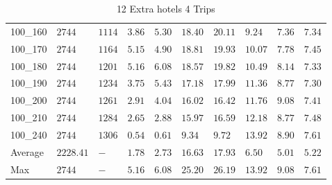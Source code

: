 \begin{center}
\begin{table}[]
\begin{tabular}{|lll|l|l|ll|lll|}
100\_160 & $2744   $   & $1114$ & $3.86$ & $5.30$   & $18.40$    & $20.11$   & $9.24 $& $7.36$   & $7.34 $ \\
100\_170 & $2744   $   & $1164$ & $5.15$ & $4.90$   & $18.81$    & $19.93$   & $10.07$& $7.78$   & $7.45 $ \\
100\_180 & $2744   $   & $1201$ & $5.16$ & $6.08$   & $18.57$    & $19.82$   & $10.49$& $8.14$   & $7.33 $ \\
100\_190 & $2744   $   & $1234$ & $3.75$ & $5.43$   & $17.18$    & $17.99$   & $11.36$& $8.77$   & $7.30 $ \\
100\_200 & $2744   $   & $1261$ & $2.91$ & $4.04$   & $16.02$    & $16.42$   & $11.76$& $9.08$   & $7.41 $ \\
100\_210 & $2744   $   & $1284$ & $2.65$ & $2.88$   & $15.97$    & $16.59$   & $12.18$& $8.77$   & $7.48 $ \\
100\_240 & $2744   $   & $1306$ & $0.54$ & $0.61$   & $9.34$    & $9.72$   & $13.92$& $8.90$   & $7.61 $ \\
\hline
Average  & $2228.41$   & $-   $ & $1.78$ & $2.73$   & $16.63$    & $17.93$   & $6.50 $& $5.01$   & $5.22 $ \\
Max      & $2744   $   & $-   $ & $5.16$ & $6.08$   & $25.20$    & $26.19$   & $13.92$& $9.08$   & $7.61 $ \\
\hline
\end{tabular}
\caption{12 Extra hotels 4 Trips}
\label{12-4}
\end{table}
\end{center}
